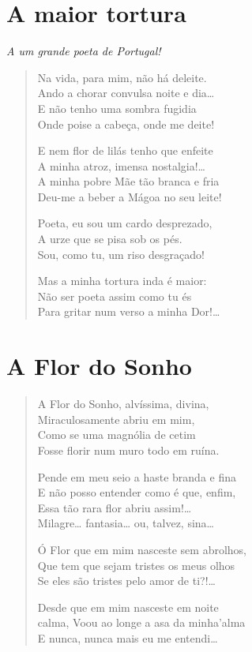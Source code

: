 \chapter{A maior tortura}

\hfill{}\textit{A um grande poeta de Portugal!}

\begin{verse}
Na vida, para mim, não há deleite.\\
Ando a chorar convulsa noite e dia\ldots{}\\
E não tenho uma sombra fugidia\\
Onde poise a cabeça, onde me deite!

E nem flor de lilás tenho que enfeite\\
A minha atroz, imensa nostalgia!\ldots{}\\
A minha pobre Mãe tão branca e fria\\
Deu-me a beber a Mágoa no seu leite!

Poeta, eu sou um cardo desprezado,\\
A urze que se pisa sob os pés.\\
Sou, como tu, um riso desgraçado!

Mas a minha tortura inda é maior:\\
Não ser poeta assim como tu és\\
Para gritar num verso a minha Dor!\ldots{}
\end{verse}


\chapter{A Flor do Sonho}

\begin{verse}
A Flor do Sonho, alvíssima, divina,\\
Miraculosamente abriu em mim,\\
Como se uma magnólia de cetim\\
Fosse florir num muro todo em ruína.

Pende em meu seio a haste branda e fina\\
E não posso entender como é que, enfim,\\
Essa tão rara flor abriu assim!\ldots{}\\
Milagre\ldots{} fantasia\ldots{} ou, talvez, sina\ldots{}

Ó Flor que em mim nasceste sem abrolhos,\\
Que tem que sejam tristes os meus olhos\\
Se eles são tristes pelo amor de ti?!\ldots{}

Desde que em mim nasceste em noite\\
calma, Voou ao longe a asa da minha’alma\\
E nunca, nunca mais eu me entendi\ldots{} 
\end{verse}

